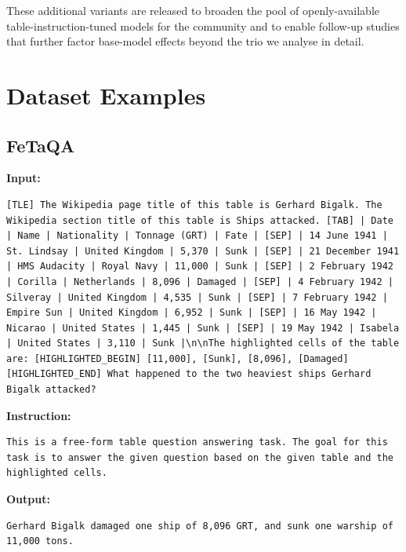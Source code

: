\documentclass[11pt]{article}
\begin{document}
These additional variants are released to broaden the pool of openly-available table-instruction-tuned models for the community and to enable follow-up studies that further factor base-model effects beyond the trio we analyse in detail.


\section{Dataset Examples}
\label{app-sec: dataset-examples}

\subsection{FeTaQA}

\textbf{Input:}
\begin{lstlisting}
[TLE] The Wikipedia page title of this table is Gerhard Bigalk. The Wikipedia section title of this table is Ships attacked. [TAB] | Date | Name | Nationality | Tonnage (GRT) | Fate | [SEP] | 14 June 1941 | St. Lindsay | United Kingdom | 5,370 | Sunk | [SEP] | 21 December 1941 | HMS Audacity | Royal Navy | 11,000 | Sunk | [SEP] | 2 February 1942 | Corilla | Netherlands | 8,096 | Damaged | [SEP] | 4 February 1942 | Silveray | United Kingdom | 4,535 | Sunk | [SEP] | 7 February 1942 | Empire Sun | United Kingdom | 6,952 | Sunk | [SEP] | 16 May 1942 | Nicarao | United States | 1,445 | Sunk | [SEP] | 19 May 1942 | Isabela | United States | 3,110 | Sunk |\n\nThe highlighted cells of the table are: [HIGHLIGHTED_BEGIN] [11,000], [Sunk], [8,096], [Damaged] [HIGHLIGHTED_END] What happened to the two heaviest ships Gerhard Bigalk attacked?
\end{lstlisting}

\textbf{Instruction:}
\begin{lstlisting}
This is a free-form table question answering task. The goal for this task is to answer the given question based on the given table and the highlighted cells.
\end{lstlisting}
\textbf{Output:}
\begin{lstlisting}
Gerhard Bigalk damaged one ship of 8,096 GRT, and sunk one warship of 11,000 tons.
\end{lstlisting}
\end{document}
